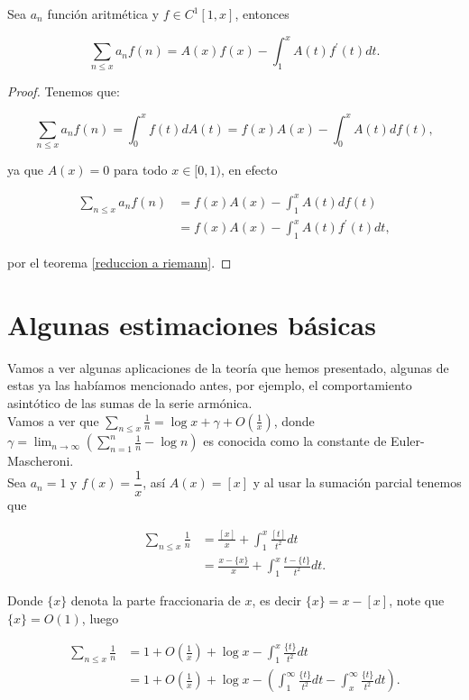 \begin{theorem}\label{Teorema sumacion de Abel}
Sea $a_n$ función aritmética y $f\in C^1[1,x]$, entonces

$$
\sum_{n \leq x} a_n f(n)=A(x) f(x)-\int_1^x A(t) f^{\prime}(t) d t .
$$
\end{theorem}

\begin{proof}
Tenemos que:

$$\sum_{n \leq x} a_n f(n)=\int_0^xf(t)dA(t)=f(x)A(x)-\int_0^xA(t)df(t),$$

ya que $A(x)=0$ para todo $x\in [0,1)$, en efecto

\begin{align*}
    \sum_{n \leq x} a_n f(n)&=f(x)A(x)-\int_1^xA(t)df(t)\\
    &=f(x)A(x)-\int_1^xA(t)f^{'}(t)dt
,\end{align*}

por  el teorema \ref{reduccion a riemann}.
\end{proof}

\section{Algunas estimaciones básicas}

Vamos a ver algunas aplicaciones de la teoría que hemos presentado, algunas de estas ya las habíamos mencionado antes, por ejemplo, el comportamiento asintótico de las sumas de la serie armónica.\\

Vamos a ver que $\displaystyle\sum_{n \leq x} \frac{1}{n} =\log x+\gamma+O\left(\frac{1}{x}\right)$, donde $\gamma=\displaystyle\lim_{n \to \infty} \left( \sum_{n=1}^{n}\frac{1}{n} -\log n\right)$ es conocida como la constante de Euler-Mascheroni.\\

Sea $a_n=1$ y $f(x)=\dfrac{1}{x}$, así $A(x)=[x]$ y al usar la sumación parcial tenemos que


$$
\begin{aligned}
\sum_{n \leq x} \frac{1}{n} & =\frac{[x]}{x}+\int_1^x \frac{[t]}{t^2} d t \\
& =\frac{x-\{x\}}{x}+\int_1^x \frac{t-\{t\}}{t^2} d t.
\end{aligned}
$$

Donde $\{x\}$ denota la parte fraccionaria de $x$, es decir $\{x\}=x-[x]$, note que $\{x\}=O(1)$, luego

\begin{align*}
   \sum_{n \leq x} \frac{1}{n}&=1+O\left(\frac{1}{x}\right)+\log x-\int_1^x \frac{\{t\}}{t^2} d t\\
   &=1+O\left(\frac{1}{x}\right)+\log x-\left(\int_1^{\infty} \frac{\{t\}}{t^2} d t-\int_x^{\infty} \frac{\{t\}}{t^2} d t\right)
.\end{align*}

